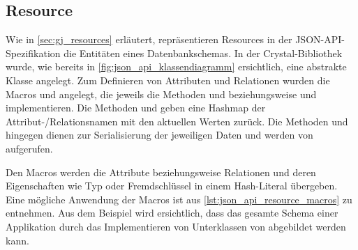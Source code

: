 \subsection{Resource}
\label{ssec:bj_resource}

Wie in \cref{sec:gj_resources} erläutert, repräsentieren Resources in der
JSON-API-Spezifikation die Entitäten eines Datenbankschemas.  In der
Crystal-Bibliothek wurde, wie bereits in \cref{fig:json_api_klassendiagramm}
ersichtlich, eine abstrakte Klasse  angelegt.  Zum Definieren
von Attributen und Relationen wurden die Macros  und
 angelegt, die jeweils die Methoden
 und  beziehungsweise
 und 
implementieren.  Die Methoden  und
 geben eine Hashmap der Attribut-/Relationsnamen mit
den aktuellen Werten zurück.  Die Methoden  und
 hingegen dienen zur Serialisierung der
jeweiligen Daten und werden von  aufgerufen.

Den Macros werden die Attribute beziehungsweise Relationen und deren
Eigenschaften wie Typ oder Fremdschlüssel in einem Hash-Literal übergeben.
Eine mögliche Anwendung der Macros ist aus \cref{lst:json_api_resource_macros}
zu entnehmen.  Aus dem Beispiel wird ersichtlich, dass das gesamte Schema einer
Applikation durch das Implementieren von Unterklassen von 
abgebildet werden kann.


